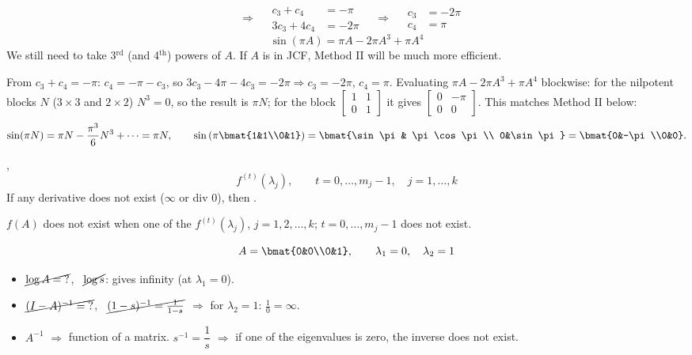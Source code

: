 \begin{example}
\[\quad\Rightarrow\quad
\begin{aligned} c_3 + c_4 &= -\pi\\ 3c_3 + 4c_4 &= -2\pi\end{aligned}
\quad\Rightarrow\quad
\boxed{\begin{aligned} c_3 &= -2\pi\\ c_4 &= \pi\end{aligned}}
\]
\[
\boxed{\sin(\pi A) = \pi A - 2\pi A^3 + \pi A^4}
\]
We still need to take 3$^{\text{rd}}$ (and 4$^{\text{th}}$) powers of $A$. If $A$ is in JCF, Method II will be much more efficient.
\begin{insight}[Check]
From $c_3+c_4=-\pi$: $c_4=-\pi-c_3$, so $3c_3-4\pi-4c_3=-2\pi \Rightarrow c_3=-2\pi$, $c_4=\pi$. Evaluating $\pi A-2\pi A^3+\pi A^4$ blockwise: for the nilpotent blocks $N$ ($3\times3$ and $2\times2$) $N^3=0$, so the result is $\pi N$; for the block $\left[\begin{smallmatrix}1&1\\0&1\end{smallmatrix}\right]$ it gives $\left[\begin{smallmatrix}0&-\pi\\0&0\end{smallmatrix}\right]$. This matches Method II below:
\[
\sin(\pi N)=\pi N-\frac{\pi^3}{6}N^3+\dots=\pi N,
\qquad
\sin\left(\pi\bmat{1&1\\0&1}\right)=\bmat{\sin\pi & \pi\cos\pi\\ 0&\sin\pi}=\bmat{0&-\pi\\0&0}.
\]
\end{insight}
\end{example}

\sep
\[
f^{(t)}(\lambda_j), \qquad t = 0,\dots,m_j-1, \quad j = 1,\dots,k
\]
If any derivative does not exist ($\infty$ or div 0), then .

\begin{remark}
$f(A)$ does not exist when one of the $f^{(t)}(\lambda_j)$, $j = 1,2,\dots,k$; $t = 0,\dots,m_j-1$ does not exist.
\end{remark}

\begin{example}
\[
A = \bmat{0&0\\0&1}, \qquad \lambda_1 = 0, \quad \lambda_2 = 1
\]
\begin{itemize}
\item $\cancel{\log A = {?}}$, \ $\cancel{\log s}$: gives infinity (at $\lambda_1=0$).
\item $\cancel{(I-A)^{-1} = {?}}$, \ $\cancel{(1-s)^{-1} = \tfrac{1}{1-s}}$ $\Rightarrow$ for $\lambda_2 = 1$: $\tfrac{1}{0} = \infty$.
\item $A^{-1}$ $\Longrightarrow$ function of a matrix. $s^{-1} = \dfrac1s$ $\Rightarrow$ if one of the eigenvalues is zero, the inverse does not exist.
\end{itemize}
\end{example}

